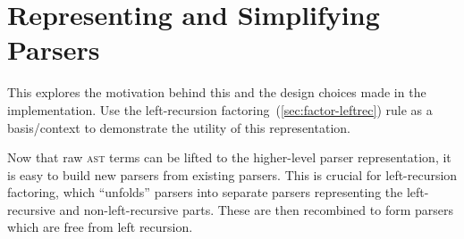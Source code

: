 \documentclass[../../../main.tex]{subfiles}
\begin{document}
\section{Representing and Simplifying Parsers}\label{sec:parser-representation}



This  explores the motivation behind this and the design choices made in the implementation.
Use the left-recursion factoring~(\cref{sec:factor-leftrec}) rule as a basis/context to demonstrate the utility of this representation.


Now that raw \textsc{ast} terms can be lifted to the higher-level parser representation, it is easy to build new parsers from existing parsers.
This is crucial for left-recursion factoring, which ``unfolds'' parsers into separate parsers representing the left-recursive and non-left-recursive parts.
These are then recombined to form parsers which are free from left recursion.
\end{document}
